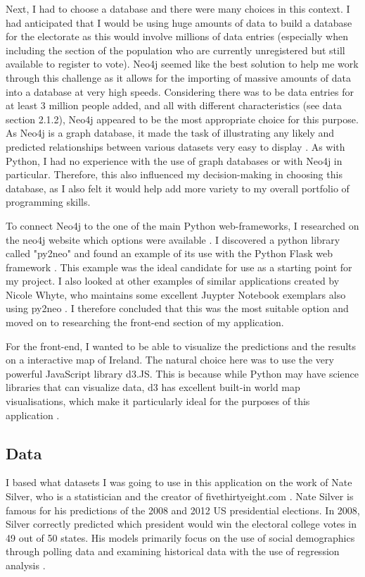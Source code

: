 Next, I had to choose a database and there were many choices in this context. I had anticipated that I would be using huge amounts of data to build a database for the electorate as this would involve millions of data entries (especially when including the section of the population who are currently unregistered but still available to register to vote). Neo4j seemed like the best solution to help me work through this challenge as it allows for the importing of massive amounts of data into a database at very high speeds. Considering there was to be data entries for at least 3 million people added, and all with different characteristics (see data section 2.1.2), Neo4j appeared to be the most appropriate choice for this purpose. As Neo4j is a graph database, it made the task of illustrating any likely and predicted relationships between various datasets very easy to display \cite{neo4jreasons}. As with Python, I had no experience with the use of graph databases or with Neo4j in particular. Therefore, this also influenced my decision-making in choosing this database, as I also felt it would help add more variety to my overall portfolio of programming skills.

To connect Neo4j to the one of the main Python web-frameworks, I researched on the neo4j website which options were available \cite{neo4jpython}. I discovered a python library called "py2neo" and found an example of its use with the Python Flask web framework \cite{nicolewhite}. This example was the ideal candidate for use as a starting point for my project. I also looked at other examples of similar applications created by Nicole Whyte, who maintains some excellent Juypter Notebook exemplars also using py2neo \cite{nicolewhitejuypter}. I
therefore concluded that this was the most suitable option and moved on to researching
the front-end section of my application.

For the front-end, I wanted to be able to visualize the predictions and the results on a interactive map of Ireland. The natural choice here was to use the very powerful JavaScript library d3.JS. This is because while Python may have science libraries that can visualize data, d3 has excellent built-in world map visualisations, which make it particularly ideal for the purposes of this application \cite{d3blocks}.

\subsection{Data}
I based what datasets I was going to use in this application on the work of Nate Silver, who is a statistician and the 
creator of fivethirtyeight.com \cite{natefaq}. Nate Silver is famous for his predictions of the 2008 and 2012 US presidential elections. In 2008, Silver correctly predicted which president would win the electoral college votes in 49 out of 50 states. His models primarily focus on the use of social demographics through polling data and examining historical data with the use of regression analysis \cite{bobohara}.
